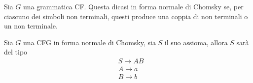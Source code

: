 \documentclass{subfiles}
\begin{document}
\begin{Definition*}
    Sia \(G\) una grammatica CF. Questa dicasi in forma normale di Chomsky se, per ciascuno dei simboli non terminali, questi produce una coppia di non terminali o un non terminale.
\end{Definition*}
\begin{Example*}
    Sia \(G\) una CFG in forma normale di Chomsky, sia \(S\) il suo assioma, allora \(S\) sarà del tipo
    \[\begin{aligned}
             & S \to AB \\
             & A \to a  \\
             & B \to b  \\
        \end{aligned}\]
\end{Example*}
\clearpage
\end{document}

